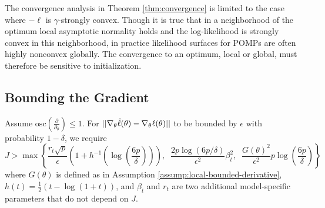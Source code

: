\documentclass{article}
\begin{document}
The convergence analysis in Theorem \ref{thm:convergence} is limited to the case where $-\ell$ is $\gamma$-strongly convex. Though it is true that in a neighborhood of the optimum local asymptotic normality holds and the log-likelihood is strongly convex in this neighborhood, in practice likelihood surfaces for POMPs are often highly nonconvex globally. The convergence to an optimum, local or global, must therefore be sensitive to initialization.  

\subsection{Bounding the Gradient}

\begin{lem}
    \label{lemma:grad_bound}
    Assume $\text{osc} \left(\frac{\partial}{\partial_\theta}\right) \leq 1$. For $||\nabla_\theta \hat{\ell}(\theta) - \nabla_\theta \ell(\theta)||$ to be bounded by $\epsilon$ with probability $1-\delta$, we require
    \begin{equation}
        J > \max\left\{\frac{r_t\sqrt{p}}{\epsilon}\left(1+h^{-1}\left(\log\left(\frac{6p}{\delta}\right)\right)\right),\;\; \frac{2p\log(6p/\delta)}{\epsilon^2}\beta_t^2, \;\;\frac{G(\theta)^2}{\epsilon^2}p\log\left(\frac{6p}{\delta}\right)\right\}
    \end{equation}
    where $G(\theta)$ is defined as in Assumption \ref{assump:local-bounded-derivative}, $h(t) = \frac{1}{2}(t - \log(1+t))$, and $\beta_t$ and $r_t$ are two additional model-specific parameters that do not depend on $J$. 
\end{lem}
\end{document}

